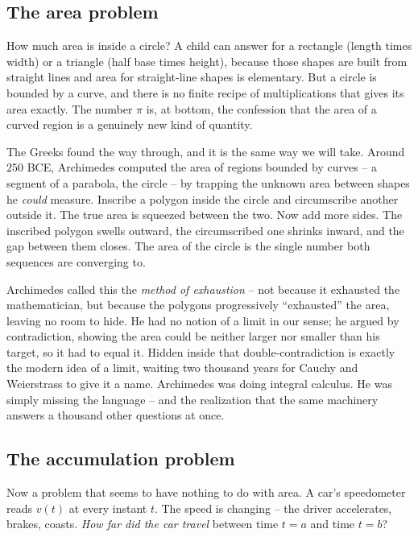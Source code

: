 \subsection{The area problem}

How much area is inside a circle? A child can answer for a rectangle (length
times width) or a triangle (half base times height), because those shapes are
built from straight lines and area for straight-line shapes is elementary. But a
circle is bounded by a curve, and there is no finite recipe of multiplications
that gives its area exactly. The number $\pi$ is, at bottom, the confession that
the area of a curved region is a genuinely new kind of quantity.

The Greeks found the way through, and it is the same way we will take. Around
$250$ BCE, Archimedes computed the area of regions bounded by curves -- a
segment of a parabola, the circle -- by trapping the unknown area between shapes
he \emph{could} measure. Inscribe a polygon inside the circle and circumscribe
another outside it. The true area is squeezed between the two. Now add more
sides. The inscribed polygon swells outward, the circumscribed one shrinks
inward, and the gap between them closes. The area of the circle is the single
number both sequences are converging to.

\begin{historybox}
Archimedes called this the \emph{method of exhaustion} -- not because it
exhausted the mathematician, but because the polygons progressively
``exhausted'' the area, leaving no room to hide. He had no notion of a limit in
our sense; he argued by contradiction, showing the area could be neither larger
nor smaller than his target, so it had to equal it. Hidden inside that
double-contradiction is exactly the modern idea of a limit, waiting two thousand
years for Cauchy and Weierstrass to give it a name. Archimedes was doing
integral calculus. He was simply missing the language -- and the realization
that the same machinery answers a thousand other questions at once.
\end{historybox}

\subsection{The accumulation problem}

Now a problem that seems to have nothing to do with area. A car's speedometer
reads $v(t)$ at every instant $t$. The speed is changing -- the driver
accelerates, brakes, coasts. \emph{How far did the car travel} between time
$t=a$ and time $t=b$?

